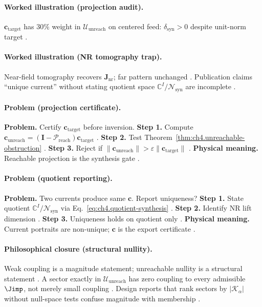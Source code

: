 \paragraph{Worked illustration (projection audit).}
\(\mathbf{c}_{\mathrm{target}}\) has \(30\%\) weight in \(\mathcal{U}_{\mathrm{unreach}}\) on centered feed: \(\delta_{\mathrm{syn}}>0\) despite
unit-norm target \cite{hansen1988,harrington2001,stratton1941}.

\paragraph{Worked illustration (NR tomography trap).}
Near-field tomography recovers \(\mathbf{J}_{\mathrm{nr}}\); far pattern unchanged \cite{stratton1941,harrington2001,devaney2004}. Publication
claims ``unique current'' without stating quotient space \(\mathbb{C}^{I}/\mathcal{N}_{\mathrm{syn}}\) are incomplete \cite{hansen1988}.

\paragraph{Problem (projection certificate).}
\textbf{Problem.} Certify \(\mathbf{c}_{\mathrm{target}}\) before inversion.
\textbf{Step 1.} Compute \(\mathbf{c}_{\mathrm{unreach}}=(\mathbf{I}-\mathcal{P}_{\mathrm{reach}})\mathbf{c}_{\mathrm{target}}\) \cite{harrington2001}.
\textbf{Step 2.} Test Theorem~\ref{thm:ch4.unreachable-obstruction} \cite{stratton1941,devaney2004}.
\textbf{Step 3.} Reject if \(\|\mathbf{c}_{\mathrm{unreach}}\|>\varepsilon\|\mathbf{c}_{\mathrm{target}}\|\) \cite{hansen1988}.
\textbf{Physical meaning.} Reachable projection is the synthesis gate \cite{stratton1941}.

\paragraph{Problem (quotient reporting).}
\textbf{Problem.} Two currents produce same \(\mathbf{c}\). Report uniqueness?
\textbf{Step 1.} State quotient \(\mathbb{C}^{I}/\mathcal{N}_{\mathrm{syn}}\) via Eq.~\eqref{eq:ch4.quotient-synthesis} \cite{harrington2001}.
\textbf{Step 2.} Identify NR lift dimension \cite{stratton1941}.
\textbf{Step 3.} Uniqueness holds on quotient only \cite{devaney2004,hansen1988}.
\textbf{Physical meaning.} Current portraits are non-unique; \(\mathbf{c}\) is the export certificate \cite{stratton1941}.

\paragraph{Philosophical closure (structural nullity).}
Weak coupling is a magnitude statement; unreachable nullity is a structural statement \cite{hansen1988,harrington2001,stratton1941}. A sector
exactly in \(\mathcal{U}_{\mathrm{unreach}}\) has zero coupling to every admissible \(\Jimp\), not merely small coupling \cite{devaney2004}. Design
reports that rank sectors by \(|\mathcal{K}_{\alpha}|\) without null-space tests confuse magnitude with membership \cite{harrington2001}.

